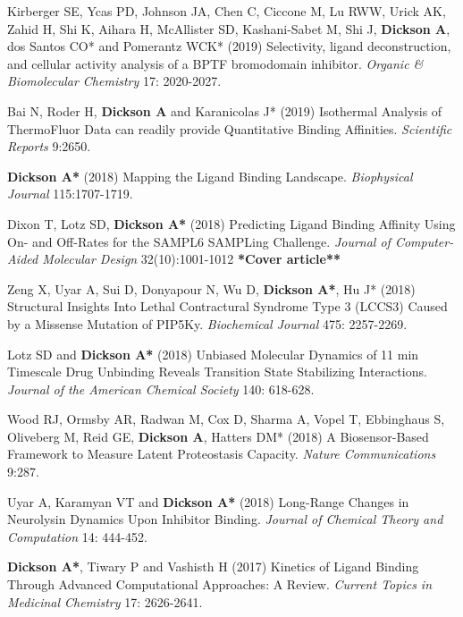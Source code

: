 \documentclass[margin,line]{res}
\begin{document}
\begin{resume}
\begin{spacing}{1.2}
\begin{thebibliography}{10}
  Kirberger SE, Ycas PD, Johnson JA, Chen C, Ciccone M, Lu RWW, Urick AK, Zahid H, Shi K, Aihara H, McAllister SD, Kashani-Sabet M, Shi J, {\bf Dickson A}, dos Santos CO* and Pomerantz WCK* (2019) Selectivity, ligand deconstruction, and cellular activity analysis of a BPTF bromodomain inhibitor.
  \newblock \textit{Organic \& Biomolecular Chemistry} 17: 2020-2027.

  Bai N, Roder H, {\bf Dickson A} and Karanicolas J* (2019) Isothermal Analysis of ThermoFluor Data can readily provide Quantitative Binding Affinities.
  \newblock \textit{Scientific Reports} 9:2650.

  {\bf Dickson A*} (2018) Mapping the Ligand Binding Landscape.
  \newblock \textit{Biophysical Journal} 115:1707-1719.

  Dixon T, Lotz SD, {\bf Dickson A*} (2018)
  Predicting Ligand Binding Affinity Using On- and Off-Rates for the SAMPL6 SAMPLing Challenge.
  \newblock \textit{Journal of Computer-Aided Molecular Design} 32(10):1001-1012 {\bf **Cover article**}

  Zeng X, Uyar A, Sui D, Donyapour N, Wu D, {\bf Dickson A*}, Hu J* (2018)
  Structural Insights Into Lethal Contractural Syndrome Type 3 (LCCS3) Caused by a Missense Mutation of PIP5Ky.
  \newblock \textit{Biochemical Journal} 475: 2257-2269.

  Lotz SD and {\bf Dickson A*} (2018)
  Unbiased Molecular Dynamics of 11 min Timescale Drug Unbinding Reveals Transition State Stabilizing Interactions.
\newblock \textit{Journal of the American Chemical Society} 140: 618-628.

  Wood RJ, Ormsby AR, Radwan M, Cox D, Sharma A, Vopel T, Ebbinghaus S, Oliveberg M, Reid GE, {\bf Dickson A}, Hatters DM* (2018)
  A Biosensor-Based Framework to Measure Latent Proteostasis Capacity.
\newblock \textit{Nature Communications} 9:287.

Uyar A, Karamyan VT and {\bf Dickson A*} (2018)
Long-Range Changes in Neurolysin Dynamics Upon Inhibitor Binding.
\newblock \textit{Journal of Chemical Theory and Computation} 14: 444-452.

  {\bf Dickson A*}, Tiwary P and Vashisth H (2017)
Kinetics of Ligand Binding Through Advanced Computational Approaches: A Review.
\newblock \textit{Current Topics in Medicinal Chemistry} 17: 2626-2641.


\end{thebibliography}
\end{spacing}
\end{resume}
\end{document}
